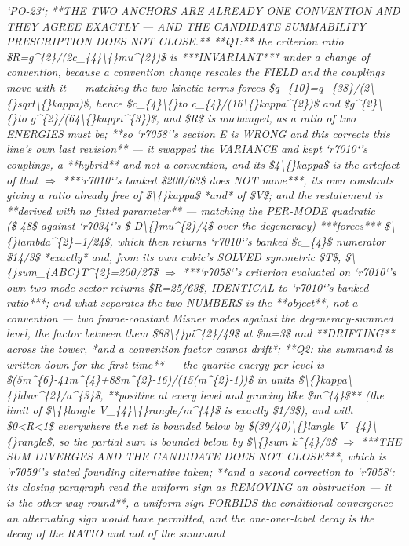 \begin{description}
\textit{`PO-23`;  **THE TWO ANCHORS ARE ALREADY ONE CONVENTION AND THEY AGREE EXACTLY --- AND THE CANDIDATE SUMMABILITY PRESCRIPTION DOES NOT CLOSE.** **Q1:** the criterion ratio \$R=g\textasciicircum{}\{2\}/(2c\_\{4\}\textbackslash\{\}mu\textasciicircum{}\{2\})\$ is ***INVARIANT*** under a change of convention, because a convention change rescales the FIELD and the couplings move with it --- matching the two kinetic terms forces \$q\_\{10\}=q\_\{38\}/(2\textbackslash\{\}sqrt\textbackslash\{\}kappa)\$, hence \$c\_\{4\}\textbackslash\{\}to c\_\{4\}/(16\textbackslash\{\}kappa\textasciicircum{}\{2\})\$ and \$g\textasciicircum{}\{2\}\textbackslash\{\}to g\textasciicircum{}\{2\}/(64\textbackslash\{\}kappa\textasciicircum{}\{3\})\$, and \$R\$ is unchanged, as a ratio of two ENERGIES must be;  **so `r7058`'s section E is WRONG and this corrects this line's own last revision** --- it swapped the VARIANCE and kept `r7010`'s couplings, a **hybrid** and not a convention, and its \$4\textbackslash\{\}kappa\$ is the artefact of that \ensuremath{\Rightarrow} ***`r7010`'s banked \$200/63\$ does NOT move***, its own constants giving a ratio already free of \$\textbackslash\{\}kappa\$ *and* of \$V\$;  and the restatement is **derived with no fitted parameter** --- matching the PER-MODE quadratic (\$-48\$ against `r7034`'s \$-D\textbackslash\{\}mu\textasciicircum{}\{2\}/4\$ over the degeneracy) ***forces*** \$\textbackslash\{\}lambda\textasciicircum{}\{2\}=1/24\$, which then returns `r7010`'s banked \$c\_\{4\}\$ numerator \$14/3\$ *exactly* and, from its own cubic's SOLVED symmetric \$T\$, \$\textbackslash\{\}sum\_\{ABC\}T\textasciicircum{}\{2\}=200/27\$ \ensuremath{\Rightarrow} ***`r7058`'s criterion evaluated on `r7010`'s own two-mode sector returns \$R=25/63\$, IDENTICAL to `r7010`'s banked ratio***; and what separates the two NUMBERS is the **object**, not a convention --- two frame-constant Misner modes against the degeneracy-summed level, the factor between them \$88\textbackslash\{\}pi\textasciicircum{}\{2\}/49\$ at \$m=3\$ and **DRIFTING** across the tower, *and a convention factor cannot drift*;  **Q2: the summand is written down for the first time** --- the quartic energy per level is \$(5m\textasciicircum{}\{6\}-41m\textasciicircum{}\{4\}+88m\textasciicircum{}\{2\}-16)/(15(m\textasciicircum{}\{2\}-1))\$ in units \$\textbackslash\{\}kappa\textbackslash\{\}hbar\textasciicircum{}\{2\}/a\textasciicircum{}\{3\}\$, **positive at every level and growing like \$m\textasciicircum{}\{4\}\$** (the limit of \$\textbackslash\{\}langle V\_\{4\}\textbackslash\{\}rangle/m\textasciicircum{}\{4\}\$ is exactly \$1/3\$), and with \$0<R<1\$ everywhere the net is bounded below by \$(39/40)\textbackslash\{\}langle V\_\{4\}\textbackslash\{\}rangle\$, so the partial sum is bounded below by \$\textbackslash\{\}sum k\textasciicircum{}\{4\}/3\$ \ensuremath{\Rightarrow} ***THE SUM DIVERGES AND THE CANDIDATE DOES NOT CLOSE***, which is `r7059`'s stated founding alternative taken;  **and a second correction to `r7058`: its closing paragraph read the uniform sign as REMOVING an obstruction --- it is the other way round**, a uniform sign FORBIDS the conditional convergence an alternating sign would have permitted, and the one-over-label decay is the decay of the RATIO and not of the summand} \ 
\end{description}
